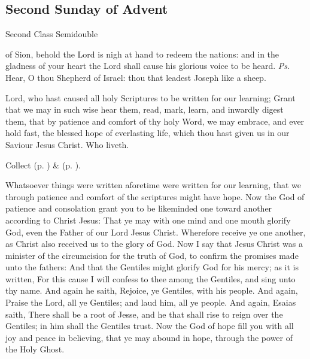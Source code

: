 \subsection{Second Sunday of Advent}
\begin{inhead}
{Second Class Semidouble}
\end{inhead}


\introit
{} of Sion, behold the Lord is nigh at hand to redeem the nations: and in the gladness of your heart the Lord shall cause his glorious voice to be heard. \textit{Ps.} Hear, O thou Shepherd of Israel: thou that leadest Joseph like a sheep.

\collect
{} Lord, who hast caused all holy Scriptures to be written for our learning; Grant that we may in such wise hear them, read, mark, learn, and inwardly digest them, that by patience and comfort of thy holy Word, we may embrace, and ever hold fast, the blessed hope of everlasting life, which thou hast given us in our Saviour Jesus Christ. Who liveth.

\begin{rubric}
     Collect  (p. \pageref{AdventICollect}) \&   (p. \pageref{SPMaryInAdvent}).
\end{rubric}

 Whatsoever things were written aforetime were written for our learning, that we through patience and comfort of the scriptures might have hope. Now the God of patience and consolation grant you to be likeminded one toward another according to Christ Jesus: That ye may with one mind and one mouth glorify God, even the Father of our Lord Jesus Christ. Wherefore receive ye one another, as Christ also received us to the glory of God. Now I say that Jesus Christ was a minister of the circumcision for the truth of God, to confirm the promises made unto the fathers: And that the Gentiles might glorify God for his mercy; as it is written, For this cause I will confess to thee among the Gentiles, and sing unto thy name. And again he saith, Rejoice, ye Gentiles, with his people. And again, Praise the Lord, all ye Gentiles; and laud him, all ye people. And again, Esaias saith, There shall be a root of Jesse, and he that shall rise to reign over the Gentiles; in him shall the Gentiles trust. Now the God of hope fill you with all joy and peace in believing, that ye may abound in hope, through the power of the Holy Ghost.

